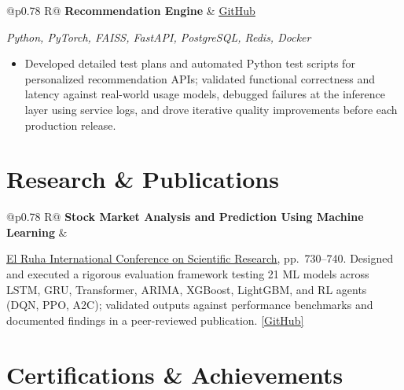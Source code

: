 \documentclass[a4paper,10pt]{article}
\newcommand{\ulink}[2]{\href{#1}{\uline{#2}}}
\newcommand{\subheading}[1]{{\color[HTML]{0A0A0A}\fontsize{12}{14}\selectfont\bfseries #1}}
\newcommand{\techstack}[1]{{\color[HTML]{5C5C5C}\fontsize{10.5}{12.5}\selectfont\itshape #1}}
\newcommand{\meta}[1]{{\color[HTML]{5C5C5C}\fontsize{10.5}{12.5}\selectfont #1}}
\begin{document}
\begin{tabularx}{\linewidth}{@{}p{0.78\linewidth} R@{}}
\subheading{Recommendation Engine} & \meta{\ulink{https://github.com/su-jin1425/Recommendation-Engine}{GitHub}}
\end{tabularx}
\vspace{1pt}
\techstack{Python, PyTorch, FAISS, FastAPI, PostgreSQL, Redis, Docker}
\begin{itemize}[nosep, leftmargin=1.5em, itemsep=1pt, topsep=2pt]
\item {\color[HTML]{0A0A0A}\fontsize{11}{14}\selectfont
Developed detailed test plans and automated Python test scripts for personalized recommendation APIs; validated functional correctness and latency against real-world usage models, debugged failures at the inference layer using service logs, and drove iterative quality improvements before each production release.}
\end{itemize}

\vspace{2pt}

\section{Research \& Publications}
\vspace{2pt}

\begin{tabularx}{\linewidth}{@{}p{0.78\linewidth} R@{}}
\subheading{Stock Market Analysis and Prediction Using Machine Learning} & \meta{2025}
\end{tabularx}
\vspace{1pt}
{\color[HTML]{0A0A0A}\fontsize{11}{14}\selectfont
\ulink{https://www.elruha.org/_files/ugd/614b1f_6b95e1b697bf452b9907ba46e0151c05.pdf\#page=774}{El Ruha International Conference on Scientific Research}, pp.\ 730--740. Designed and executed a rigorous evaluation framework testing 21 ML models across LSTM, GRU, Transformer, ARIMA, XGBoost, LightGBM, and RL agents (DQN, PPO, A2C); validated outputs against performance benchmarks and documented findings in a peer-reviewed publication. \ulink{https://github.com/su-jin1425/Set-Project}{[GitHub]}}

\vspace{2pt}

\section{Certifications \& Achievements}
\vspace{2pt}
\end{document}
